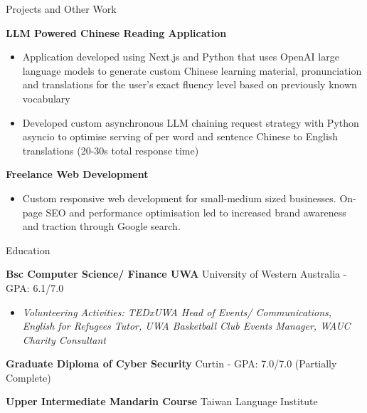 \documentclass{resume} %
\begin{document}
	\begin{rSection}{Projects and Other Work}
		\vspace{-0.8em}
		\item \textbf{LLM Powered Chinese Reading Application} 
		\begin{itemize} 
			\item Application developed using Next.js and Python that uses OpenAI large language models to generate custom Chinese learning material, pronunciation and translations for the user's exact fluency level based on previously known vocabulary
			\item Developed custom asynchronous LLM chaining request strategy with Python asyncio to optimise serving of per word and sentence Chinese to English translations (20-30s total response time)
		\end{itemize}
		\item \textbf{Freelance Web Development} 
		\begin{itemize} 
			\item Custom responsive web development for small-medium sized businesses. On-page SEO and performance optimisation led to increased brand awareness and traction through Google search.
		\end{itemize}
	\end{rSection} 
	
	\begin{rSection}{Education}
		\vspace{-0.8em}
		\item \textbf{Bsc Computer Science/ Finance UWA} {University of Western Australia} - GPA: 6.1/7.0 \hfill 
		\begin{itemize} 
			\scriptsize\item \textit{Volunteering Activities: TEDxUWA Head of Events/ Communications, English for Refugees Tutor, UWA Basketball Club Events Manager, WAUC Charity Consultant} \hfill
		\end{itemize}
		\item \textbf{Graduate Diploma of Cyber Security} {Curtin} - GPA: 7.0/7.0 \hfill (Partially Complete)
		\item \textbf{Upper Intermediate Mandarin Course} {Taiwan Language Institute}\hfill 
	\end{rSection} 
\end{document}
